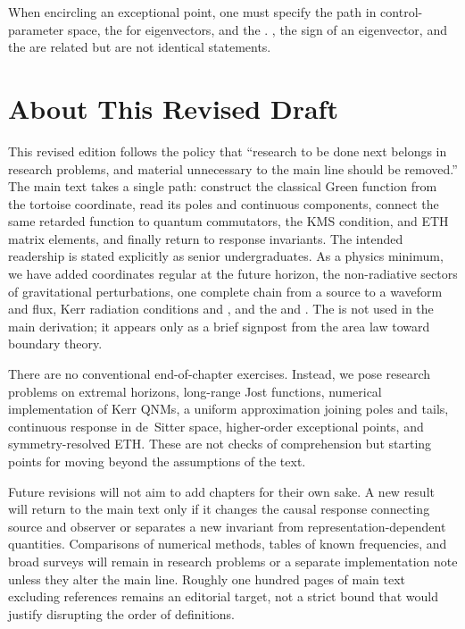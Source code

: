 When encircling an exceptional point, one must specify the path in control-parameter space, the  for eigenvectors, and the . , the sign of an eigenvector, and the  are related but are not identical statements.

\chapter*{About This Revised Draft}

This revised edition follows the policy that ``research to be done next belongs in research problems, and material unnecessary to the main line should be removed.'' The main text takes a single path: construct the classical Green function from the tortoise coordinate, read its poles and continuous components, connect the same retarded function to quantum commutators, the KMS condition, and ETH matrix elements, and finally return to response invariants. The intended readership is stated explicitly as senior undergraduates. As a physics minimum, we have added coordinates regular at the future horizon, the non-radiative sectors of gravitational perturbations, one complete chain from a source to a waveform and flux, Kerr radiation conditions and , and the  and . The  is not used in the main derivation; it appears only as a brief signpost from the area law toward boundary theory.

There are no conventional end-of-chapter exercises. Instead, we pose research problems on extremal horizons, long-range Jost functions, numerical implementation of Kerr QNMs, a uniform approximation joining poles and tails, continuous response in de~Sitter space, higher-order exceptional points, and symmetry-resolved ETH. These are not checks of comprehension but starting points for moving beyond the assumptions of the text.

Future revisions will not aim to add chapters for their own sake. A new result will return to the main text only if it changes the causal response connecting source and observer or separates a new invariant from representation-dependent quantities. Comparisons of numerical methods, tables of known frequencies, and broad surveys will remain in research problems or a separate implementation note unless they alter the main line. Roughly one hundred pages of main text excluding references remains an editorial target, not a strict bound that would justify disrupting the order of definitions.
